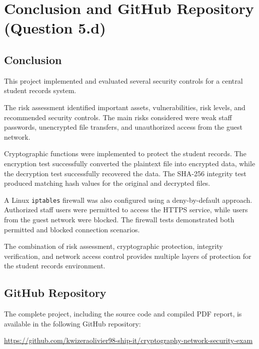 \documentclass[12pt,a4paper]{article}
\begin{document}

\newpage

\section{Conclusion and GitHub Repository (Question 5.d)}

\subsection{Conclusion}

This project implemented and evaluated several security controls for a central student records system.

The risk assessment identified important assets, vulnerabilities, risk levels, and recommended security controls. The main risks considered were weak staff passwords, unencrypted file transfers, and unauthorized access from the guest network.

Cryptographic functions were implemented to protect the student records. The encryption test successfully converted the plaintext file into encrypted data, while the decryption test successfully recovered the data. The SHA-256 integrity test produced matching hash values for the original and decrypted files.

A Linux \texttt{iptables} firewall was also configured using a deny-by-default approach. Authorized staff users were permitted to access the HTTPS service, while users from the guest network were blocked. The firewall tests demonstrated both permitted and blocked connection scenarios.

The combination of risk assessment, cryptographic protection, integrity verification, and network access control provides multiple layers of protection for the student records environment.

\subsection{GitHub Repository}

The complete project, including the source code and compiled PDF report, is available in the following GitHub repository:

\begin{center}
\url{https://github.com/kwizeraolivier98-ship-it/cryptography-network-security-exam}
\end{center}

\end{document}
